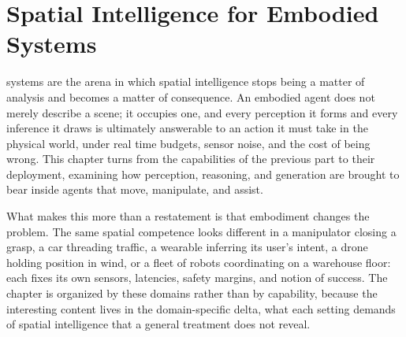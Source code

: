 \chapter{Spatial Intelligence for Embodied Systems }
\label{sec:embodied}

 systems are the arena in which spatial intelligence stops being a matter of analysis and becomes a matter of consequence. An embodied agent does not merely describe a scene; it occupies one, and every perception it forms and every inference it draws is ultimately answerable to an action it must take in the physical world, under real time budgets, sensor noise, and the cost of being wrong. This chapter turns from the capabilities of the previous part to their deployment, examining how perception, reasoning, and generation are brought to bear inside agents that move, manipulate, and assist.

What makes this more than a restatement is that embodiment changes the problem. The same spatial competence looks different in a manipulator closing a grasp, a car threading traffic, a wearable inferring its user's intent, a drone holding position in wind, or a fleet of robots coordinating on a warehouse floor: each fixes its own sensors, latencies, safety margins, and notion of success. The chapter is organized by these domains rather than by capability, because the interesting content lives in the domain-specific delta, what each setting demands of spatial intelligence that a general treatment does not reveal.


\newpage

\newpage

\newpage

\newpage
